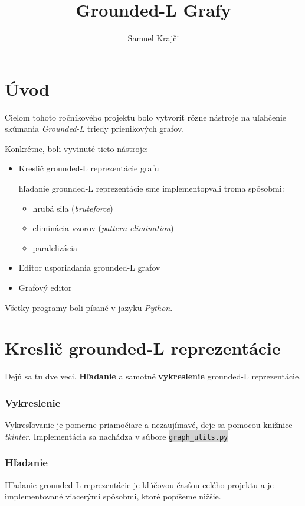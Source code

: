 \documentclass{article}
\title{Grounded-L Grafy}
\author{Samuel Krajči}
\date{}
\newcommand{\code}[1]{\colorbox{lightgray}{\lstinline{#1}}}
\begin{document}
\maketitle

\section{Úvod}

Cieľom tohoto ročníkového projektu bolo vytvoriť rôzne nástroje na uľahčenie skúmania \textit{Grounded-L} triedy prienikových grafov.

Konkrétne, boli vyvinuté tieto nástroje:

\begin{itemize}
    \item Kreslič grounded-L reprezentácie grafu
        
          hľadanie grounded-L reprezentácie sme implementopvali troma spôsobmi:
          \begin{itemize}
            \item hrubá sila (\textit{bruteforce})
            \item eliminácia vzorov (\textit{pattern elimination})
            \item paralelizácia
        \end{itemize}
    \item Editor usporiadania grounded-L grafov
    \item Grafový editor
\end{itemize}

Všetky programy boli písané v jazyku \textit{Python}.

\section{Kreslič grounded-L reprezentácie}

Dejú sa tu dve veci. \textbf{Hľadanie} a samotné \textbf{vykreslenie} grounded-L reprezentácie.

\subsubsection*{Vykreslenie} 

Vykresľovanie je pomerne priamočiare a nezaujímavé, deje sa pomocou knižnice \textit{tkinter}. Implementácia sa nachádza v súbore \code{graph_utils.py}

\subsubsection*{Hľadanie} 
Hľadanie grounded-L reprezentácie je kľúčovou časťou celého projektu a je implementované viacerými spôsobmi, ktoré popíšeme nižšie.
\end{document}
